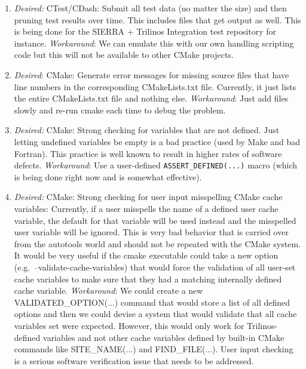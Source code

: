 \documentclass[pdf,ps2pdf,11pt]{SANDreport}
\begin{document}
\begin{enumerate}
{}\item\textit{Desired:} CTest/CDash: Submit all test data (no matter
the size) and then pruning test results over time.  This includes
files that get output as well.  This is being done for the SIERRA +
Trilinos Integration test repository for instance.
{}\textit{Workaround}: We can emulate this with our own handling
scripting code but this will not be available to other CMake projects.

{}\item\textit{Desired}: CMake: Generate error messages for missing
source files that have line numbers in the corresponding
CMakeLists.txt file.  Currently, it just lists the entire
CMakeLists.txt file and nothing else.  {}\textit{Workaround}: Just add
files slowly and re-run cmake each time to debug the problem.

{}\item\textit{Desired:} CMake: Strong checking for variables that are
not defined.  Just letting undefined variables be empty is a bad
practice (used by Make and bad Fortran).  This practice is well known
to result in higher rates of software defects.  {}\textit{Workaround}:
Use a user-defined {}\texttt{ASSERT\_DEFINED(...)} macro (which is
being done right now and is somewhat effective).

{}\item\textit{Desired:} CMake: Strong checking for user input
misspelling CMake cache variables: Currently, if a user misspells the
name of a defined user cache variable, the default for that variable
will be used instead and the misspelled user variable will be ignored.
This is very bad behavior that is carried over from the autotools
world and should not be repeated with the CMake system.  It would be
very useful if the cmake executable could take a new option (e.g.\
--validate-cache-variables) that would force the validation of all
user-set cache variables to make sure that they had a matching
internally defined cache variable.  {}\textit{Workaround}: We could
create a new VALIDATED\_OPTION(...) command that would store a list of
all defined options and then we could devise a system that would
validate that all cache variables set were expected.  However, this
would only work for Trilinos-defined variables and not other cache
variables defined by built-in CMake commands like SITE\_NAME(...) and
FIND\_FILE(...).  User input checking is a serious software
verification issue that needs to be addressed.

\end{enumerate}
\end{document}
